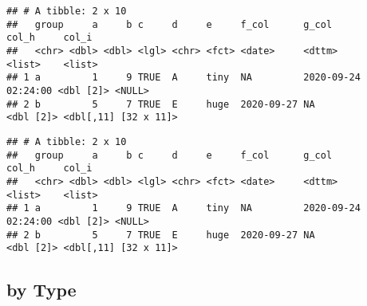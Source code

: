 \documentclass[
]{book}
\newenvironment{Shaded}{\begin{snugshade}}{\end{snugshade}}
\newcommand{\DecValTok}[1]{\textcolor[rgb]{0.00,0.00,0.81}{#1}}
\newcommand{\KeywordTok}[1]{\textcolor[rgb]{0.13,0.29,0.53}{\textbf{#1}}}
\newcommand{\NormalTok}[1]{#1}
\newcommand{\OperatorTok}[1]{\textcolor[rgb]{0.81,0.36,0.00}{\textbf{#1}}}
\newcommand{\StringTok}[1]{\textcolor[rgb]{0.31,0.60,0.02}{#1}}
\begin{document}
\begin{Shaded}
\end{Shaded}

\begin{verbatim}
## # A tibble: 2 x 10
##   group     a     b c     d     e     f_col      g_col               col_h     col_i               
##   <chr> <dbl> <dbl> <lgl> <chr> <fct> <date>     <dttm>              <list>    <list>              
## 1 a         1     9 TRUE  A     tiny  NA         2020-09-24 02:24:00 <dbl [2]> <NULL>              
## 2 b         5     7 TRUE  E     huge  2020-09-27 NA                  <dbl [2]> <dbl[,11] [32 x 11]>
\end{verbatim}

\begin{Shaded}
\end{Shaded}

\begin{verbatim}
## # A tibble: 2 x 10
##   group     a     b c     d     e     f_col      g_col               col_h     col_i               
##   <chr> <dbl> <dbl> <lgl> <chr> <fct> <date>     <dttm>              <list>    <list>              
## 1 a         1     9 TRUE  A     tiny  NA         2020-09-24 02:24:00 <dbl [2]> <NULL>              
## 2 b         5     7 TRUE  E     huge  2020-09-27 NA                  <dbl [2]> <dbl[,11] [32 x 11]>
\end{verbatim}

\hypertarget{by-type}{%
\subsection{by Type}\label{by-type}}

\begin{Shaded}
\end{Shaded}
\end{document}
